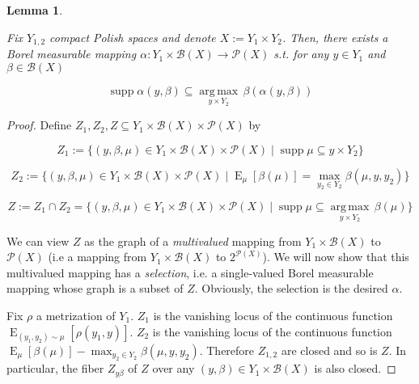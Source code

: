 \documentclass[11pt]{article}
\theoremstyle{definition}
\theoremstyle{plain}
\newtheorem{lemma}{Lemma}%
\newcommand{\Argmax}[1]{\underset{#1}{\operatorname{arg\,max}}\,}
\DeclareMathOperator{\E}{E}
\newcommand{\PM}{\mathcal{P}}
\DeclareMathOperator{\Sp}{supp}
\newcommand{\Gm}{\mathcal{B}}
\begin{document}
\begin{lemma}
\label{lmm:measurable_unwinnable}

Fix $Y_{1,2}$ compact Polish spaces and denote $X:=Y_1 \times Y_2$. Then, there exists a Borel measurable mapping $\alpha: Y_1 \times \Gm\left(X\right) \rightarrow \PM\left(X\right)$ s.t. for any $y \in Y_1$ and $\beta \in \Gm\left(X\right)$

\begin{equation}
\Sp \alpha\left(y,\beta\right) \subseteq \Argmax{y \times Y_2} \beta\left(\alpha\left(y,\beta\right)\right)
\end{equation}

\end{lemma}

\begin{proof}

Define ${Z_1, Z_2, Z \subseteq Y_1 \times \Gm\left(X\right) \times \PM\left(X\right)}$ by

$${Z_1:=\{\left(y,\beta,\mu\right) \in Y_1 \times \Gm\left(X\right) \times \PM\left(X\right) \mid \Sp \mu \subseteq y \times Y_2\}}$$

$${Z_2:=\{\left(y,\beta,\mu\right) \in Y_1 \times \Gm\left(X\right) \times \PM\left(X\right) \mid \E_\mu\left[\beta\left(\mu\right)\right] = \max_{y_2 \in Y_2} \beta\left(\mu,y,y_2\right)\}}$$

$${Z:=Z_1 \cap Z_2 =\{\left(y,\beta,\mu\right) \in Y_1 \times \Gm\left(X\right) \times \PM\left(X\right) \mid \Sp \mu \subseteq \Argmax{y \times Y_2} \beta\left(\mu\right)\}}$$

We can view ${Z}$ as the graph of a \emph{multivalued} mapping from ${Y_1 \times \Gm\left(X\right)}$ to ${\PM\left(X\right)}$ (i.e a mapping from ${Y_1 \times \Gm\left(X\right)}$ to $2^{\PM\left(X\right)}$). We will now show that this multivalued mapping has a \emph{selection}, i.e. a single-valued Borel measurable mapping whose graph is a subset of $Z$. Obviously, the selection is the desired ${\alpha}$.

Fix $\rho$ a metrization of $Y_1$. $Z_1$ is the vanishing locus of the continuous function $\E_{\left(y_1, y_2\right) \sim \mu}\left[\rho\left(y_1,y\right)\right]$. $Z_2$ is the vanishing locus of the continuous function $\E_\mu\left[\beta\left(\mu\right)\right] - \max_{y_2 \in Y_2} \beta\left(\mu,y,y_2\right)$. Therefore $Z_{1,2}$ are closed and so is $Z$. In particular, the fiber ${Z_{y\beta}}$ of ${Z}$ over any ${\left(y,\beta\right) \in Y_1 \times \Gm\left(X\right)}$ is also closed. 


\end{proof}
\end{document}
